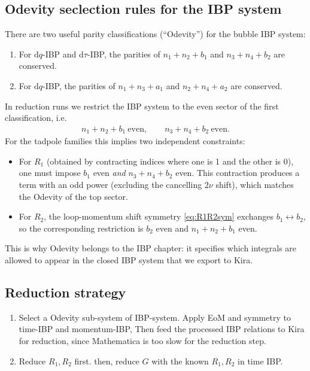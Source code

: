 \documentclass[a4paper,12pt]{article}
\def\di{{\mathrm{d}}}
\begin{document}
\subsection{Odevity seclection rules for the IBP system}
There are two useful parity classifications (``Odevity'') for the bubble IBP system:
\begin{enumerate}
\item For $\di q$-IBP and $\di \tau$-IBP, the parities of $n_1+n_2+b_1$ and $n_3+n_4+b_2$ are conserved.
\item For $\di q$-IBP, the parities of $n_1+n_3+a_1$ and $n_2+n_4+a_2$ are conserved.
\end{enumerate}
In reduction runs we restrict the IBP system to the even sector of the first classification, i.e.
\begin{align}
	n_1+n_2+b_1 \ \text{even},\qquad n_3+n_4+b_2 \ \text{even}. \label{eq:odevity_even_sector}
\end{align}
For the tadpole families this implies two independent constraints:
\begin{itemize}
\item For $R_1$ (obtained by contracting indices where one is 1 and the other is 0), one must impose $b_1$ even \emph{and} $n_3+n_4+b_2$ even. This contraction produces a term with an odd power (excluding the cancelling $2\nu$ shift), which matches the Odevity of the top sector.
\item For $R_2$, the loop-momentum shift symmetry \eqref{eq:R1R2sym} exchanges $b_1\leftrightarrow b_2$, so the corresponding restriction is $b_2$ even and $n_1+n_2+b_1$ even.
\end{itemize}
This is why Odevity belongs to the IBP chapter: it specifies which integrals are allowed to appear in the closed IBP system that we export to Kira.


\subsection{Reduction strategy}
\begin{enumerate}
	\item Select a Odevity sub-system of IBP-system. Apply EoM and symmetry to time-IBP and momentum-IBP, Then feed the processed IBP relations to Kira for reduction, since Mathematica is too slow for the reduction step.
	\item Reduce $R_1,R_2$ first. then, reduce $G$ with the known $R_1,R_2$ in time IBP.
\end{enumerate}
\end{document}
